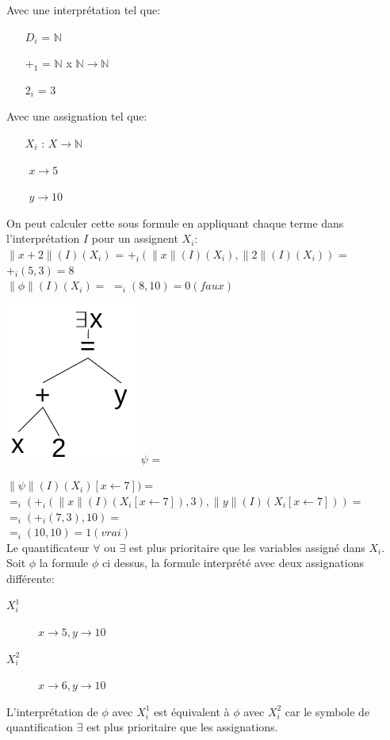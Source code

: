 Avec une interprétation tel que:
\begin{itemize}
\item[$D_i$] = $\mathbb{N}$
\item[$+_1$] = $\mathbb{N}$ x $\mathbb{N} \rightarrow \mathbb{N}$
\item[$2_i$] = $3$
\end{itemize}

Avec une assignation tel que:
\begin{itemize}
\item[$X_i$]: $X \rightarrow \mathbb{N}$
\item[$ $] $x \rightarrow 5$
\item[$ $] $y \rightarrow 10$
\end{itemize}

On peut calculer cette sous formule en appliquant chaque terme dans l'interprétation $I$ pour un assignent $X_i$:\\
$\| x + 2 \| (I)(X_i)$ = $+_i ( \| x \| (I)(X_i), \| 2 \| (I) (X_i))$ = $+_i (5,3) = 8$\\
$\| \phi \| (I)(X_i) =$ $ =_i(8,10) = 0 (faux)$\\

\begin{center}
\includegraphics[scale=0.4]{img/of-fo-sem_2.png} 
$\psi$ = \\
\end{center}
$\| \psi \| (I)(X_i)[x \leftarrow 7]) =$\\
$ =_i ( +_i (\| x\| (I)(X_i [x \leftarrow 7 ]), 3), \| y \| (I)(X_i[x \leftarrow 7])) = $\\
$ =_i ( +_i (7,3), 10) = $\\
$ =_i (10,10) = 1(vrai)$\\

Le quantificateur $\forall$ ou $\exists$ est plus prioritaire que les variables assigné dans $X_i$.\\

Soit $\phi$ la formule $\phi$ ci dessus, la formule interprété avec deux assignations différente:
\begin{description}
\item[$X_i^1$] $x \rightarrow 5, y \rightarrow 10$
\item[$X_i^2$] $x \rightarrow 6, y \rightarrow 10$
\end{description}

L'interprétation de $\phi$ avec $X_i^1$ est équivalent à $\phi$ avec $X_i^2$ car le symbole de quantification $\exists$ est plus prioritaire que les assignations.\\



\pagebreak
